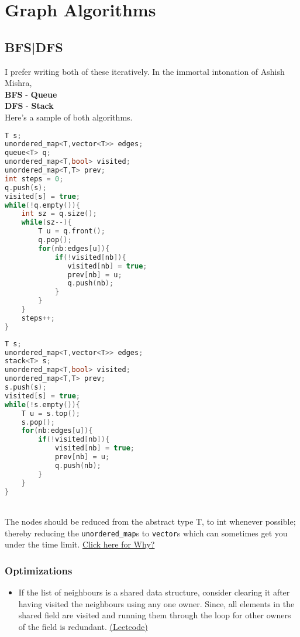 \documentclass{article}
\begin{document}
\section{Graph Algorithms}
\subsection{BFS|DFS}
I prefer writing both of these iteratively. In the immortal
intonation of Ashish Mishra,\\
\textbf{BFS} - \textbf{Queue}\\
\textbf{DFS} - \textbf{Stack}\\
Here's a sample of both algorithms.\\
\noindent\begin{minipage}{.45\textwidth}
    \begin{lstlisting}[caption=BFS,language=C++]
T s;
unordered_map<T,vector<T>> edges;
queue<T> q;
unordered_map<T,bool> visited;
unordered_map<T,T> prev;
int steps = 0;
q.push(s);
visited[s] = true;
while(!q.empty()){
    int sz = q.size();
    while(sz--){
        T u = q.front();
        q.pop();
        for(nb:edges[u]){
            if(!visited[nb]){
               visited[nb] = true;
               prev[nb] = u;
               q.push(nb);
            }
        }
    }
    steps++;
}
        \end{lstlisting}
    \end{minipage}\hfill
    \begin{minipage}{.45\textwidth}
        \begin{lstlisting}[caption=DFS,language=C++]
T s;
unordered_map<T,vector<T>> edges;
stack<T> s;
unordered_map<T,bool> visited;
unordered_map<T,T> prev;
s.push(s);
visited[s] = true;
while(!s.empty()){
    T u = s.top();
    s.pop();
    for(nb:edges[u]){
        if(!visited[nb]){
            visited[nb] = true;
            prev[nb] = u;
            q.push(nb);
        }
    }
}
\end{lstlisting}
\end{minipage}\\
The nodes should be reduced from the abstract type T, to
int whenever possible; thereby reducing the
\texttt{unordered\_map}s to \texttt{vector}s which can
sometimes get you under the time limit.
\href{https://stackoverflow.com/questions/55451825/why-is-vector-faster-than-unordered-map}{Click here for Why?}
\subsubsection*{Optimizations}
\begin{itemize}
    \item If the list of neighbours is a shared data structure, consider clearing it after having visited
    the neighbours using any one owner. Since, all elements in the shared field are visited and running them
    through the loop for other owners of the field is redundant. \href{https://leetcode.com/problems/jump-game-iv/}{(Leetcode)}
\end{itemize}
\end{document}

